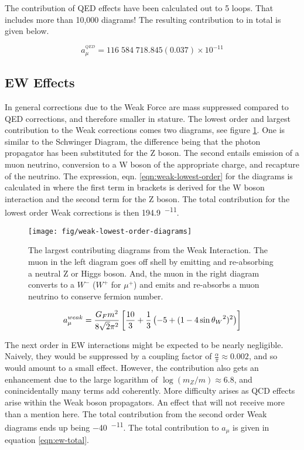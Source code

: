 The contribution of QED effects have been calculated out to 5 loops\cite{5-loop-qed}.  That includes more than 10,000 diagrams!  The resulting contribution to \mugmtwo in total is given below.

\begin{equation}
\label{eqn:qed-total}
a_\mu^{^{QED}} = 116\;584\;718.845(0.037) \times 10^{-11}
\end{equation}

\subsection{EW Effects} \label{s-sec:theory-ew}

In general corrections due to the Weak Force are mass suppressed compared to QED corrections, and therefore smaller in stature.  The lowest order and largest contribution to the Weak corrections comes two diagrams, see figure \ref{fig:weak-lowest-order-diagrams}. One is similar to the Schwinger Diagram, the difference being that the photon propagator has been substituted for the Z boson.  The second entails emission of a muon neutrino, conversion to a W boson of the appropriate charge, and recapture of the neutrino.  The expression, eqn. \ref{eqn:weak-lowest-order} for the diagrams is calculated in\cite{the-muon-g-2} where the first term in brackets is derived for the W boson interaction and the second term for the Z boson.  The total contribution for the lowest order Weak corrections is then \SI{194.9}{^{-11}}.

\begin{figure}
\label{fig:weak-lowest-order-diagrams}
\centering
\texttt{[image: fig/weak-lowest-order-diagrams]}
\caption{The largest contributing diagrams from the Weak Interaction.  The muon in the left diagram goes off shell by emitting and re-absorbing a neutral Z or Higgs boson.  And, the muon in the right diagram converts to a $W^{-}$ ($W^{+}$ for $\mu^{+}$) and emits and re-absorbs a muon neutrino to conserve fermion number.}
\end{figure}

\begin{equation}
\label{eqn:weak-lowest-order}
a_\mu^{weak} = \frac{G_F m^2}{8\sqrt{2}\pi^2} \\
\left[\frac{10}{3} + \frac{1}{3} \left(-5 + (1 - 4\sin{\theta_W}^2)^2 \right) \right]
\end{equation}

The next order in EW interactions might be expected to be nearly negligible.  Naively, they would be suppressed by a coupling factor of $\frac{\alpha}{\pi} \approx 0.002$, and so would amount to a small effect.  However, the contribution also gets an enhancement due to the large logarithm of $\log(m_Z/m) \approx 6.8$, and conincidentally many terms add coherently.  More difficulty arises as QCD effects arise within the Weak boson propagators.  An effect that will not receive more than a mention here.  The total contribution from the second order Weak diagrams ends up being \SI{-40}{^{-11}}\cite{the-muon-g-2}.  The total contribution to $a_\mu$ is given in equation \ref{eqn:ew-total}. 

